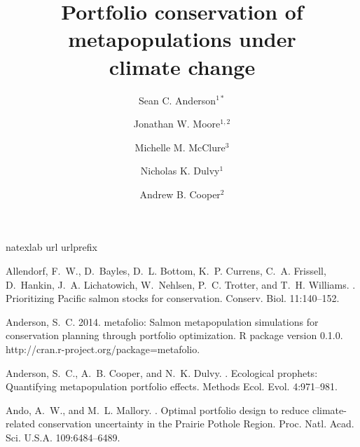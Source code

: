 \documentclass[12pt,english]{article}
\title{Portfolio conservation of metapopulations under\\climate change}
\author{
Sean C. Anderson$^{1\ast}$ \and Jonathan W. Moore$^{1,2}$ \and Michelle M. McClure$^3$ \and
Nicholas K. Dulvy$^1$ \and Andrew B. Cooper$^2$
}
\date{}
\begin{document}
\raggedright

\begin{spacing}{1.1}
\setlength\parskip{0.11in}
\setlength\parindent{0in}
%
\setlength\parskip{0in}
\end{spacing}

\setcounter{page}{1}
\linenumbers

\begin{spacing}{1.9}
\setlength{\parindent}{0.9cm}

\maketitle



%
%
%
\begin{thebibliography}{64}
\expandafter\ifx\csname natexlab\endcsname\relax\def\natexlab#1{#1}\fi
\expandafter\ifx\csname url\endcsname\relax
  \def\url#1{{\tt #1}}\fi
\expandafter\ifx\csname urlprefix\endcsname\relax\def\urlprefix{URL }\fi

Allendorf, F.~W., D.~Bayles, D.~L. Bottom, K.~P. Currens, C.~A. Frissell,
  D.~Hankin, J.~A. Lichatowich, W.~Nehlsen, P.~C. Trotter, and T.~H. Williams.
.
\newblock Prioritizing {Pacific} salmon stocks for conservation.
\newblock Conserv. Biol. 11:140--152.

Anderson, S.~C. 2014.
\newblock metafolio: Salmon metapopulation simulations for conservation
  planning through portfolio optimization. R package version 0.1.0.
  http://cran.r-project.org/package=metafolio.

Anderson, S.~C., A.~B. Cooper, and N.~K. Dulvy.
.
\newblock Ecological prophets: Quantifying metapopulation portfolio effects.
\newblock Methods Ecol. Evol. 4:971--981.

Ando, A.~W., and M.~L. Mallory.
.
\newblock Optimal portfolio design to reduce climate-related conservation
  uncertainty in the {Prairie Pothole Region}.
\newblock Proc. Natl. Acad. Sci. U.S.A. 109:6484--6489.


\end{thebibliography}
\end{spacing}
\end{document}
